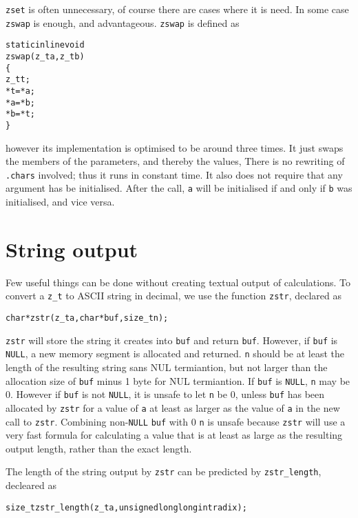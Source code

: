 {\tt zset} is often unnecessary, of course
there are cases where it is need. In some case
{\tt zswap} is enough, and advantageous.
{\tt zswap} is defined as

\begin{alltt}
   \textcolor{c}{static inline} void
   zswap(z_t a, z_t b)
   \{
       z_t t;
       *t = *a;
       *a = *b;
       *b = *t;
   \}
\end{alltt}

\noindent
however its implementation is optimised to be
around three times. It just swaps the members
of the parameters, and thereby the values, There
is no rewriting of {\tt .chars} involved; thus
it runs in constant time. It also does not
require that any argument has be initialised.
After the call, {\tt a} will be initialised
if and only if {\tt b} was initialised, and
vice versa.


\newpage
\section{String output}
\label{sec:String output}

Few useful things can be done without creating
textual output of calculations. To convert a
{\tt z\_t} to ASCII string in decimal, we use the
function {\tt zstr}, declared as

\begin{alltt}
   char *zstr(z_t a, char *buf, size_t n);
\end{alltt}

\noindent
{\tt zstr} will store the string it creates into
{\tt buf} and return {\tt buf}. However, if {\tt buf}
is {\tt NULL}, a new memory segment is allocated
and returned. {\tt n} should be at least the length
of the resulting string sans NUL termiantion, but
not larger than the allocation size of {\tt buf}
minus 1 byte for NUL termiantion. If {\tt buf} is
{\tt NULL}, {\tt n} may be 0. However if {\tt buf}
is not {\tt NULL}, it is unsafe to let {\tt n} be
0, unless {\tt buf} has been allocated by {\tt zstr}
for a value of {\tt a} at least as larger as the
value of {\tt a} in the new call to {\tt zstr}.
Combining non-\texttt{NULL} {\tt buf} with 0 {\tt n}
is unsafe because {\tt zstr} will use a very fast
formula for calculating a value that is at least
as large as the resulting output length, rather
than the exact length.

The length of the string output by {\tt zstr} can
be predicted by {\tt zstr\_length}, decleared as

\begin{alltt}
   size_t zstr_length(z_t a, unsigned long long int radix);
\end{alltt}

